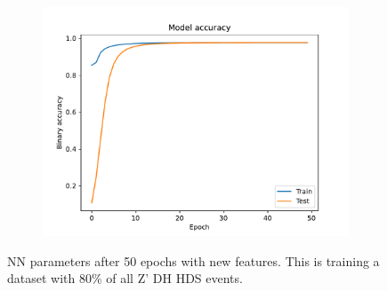 \documentclass[12pt, a4paper]{book}
\begin{document}
\begin{figure}[!ht]
\begin{subfigure}[b]{0.49\textwidth}
   \end{subfigure}
   \hfill
	\begin{subfigure}[b]{0.49\textwidth}
      \centering
      \includegraphics[width=1\textwidth]{New_pad/Binary_accuracy.pdf}
   \end{subfigure}
   \caption[NN parameters after 50 epochs with new features]{NN parameters after 50 epochs with new features.  This is training a dataset with 80\% of all Z' DH HDS events.}\label{fig:NN_stats_pad}
\end{figure}
\end{document}
